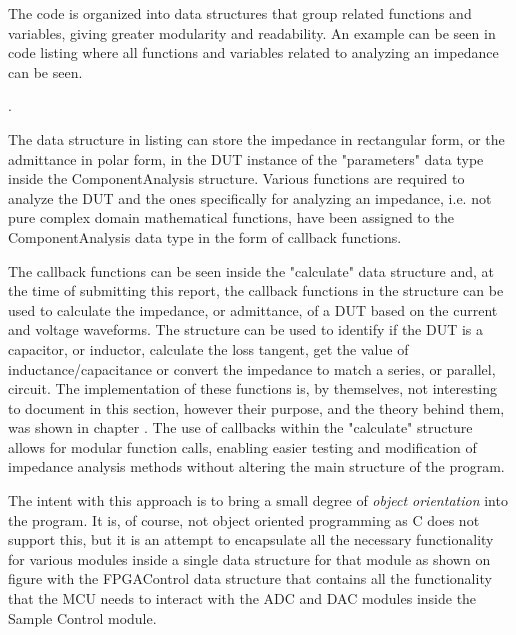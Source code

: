 The code is organized into data structures that group related functions and variables, giving greater modularity and readability. An example can be seen in code listing  where all functions and variables related to analyzing an impedance can be seen.

. 

The data structure in listing  can store the impedance in rectangular form, or the admittance in polar form, in the DUT instance of the "parameters" data type inside the ComponentAnalysis structure. Various functions are required to analyze the DUT and the ones specifically for analyzing an impedance, i.e. not pure complex domain mathematical functions, have been assigned to the ComponentAnalysis data type in the form of callback functions.

The callback functions can be seen inside the "calculate" data structure and, at the time of submitting this report, the callback functions in the structure can be used to calculate the impedance, or admittance, of a DUT based on the current and voltage waveforms. The structure can be used to identify if the DUT is a capacitor, or inductor, calculate the loss tangent, get the value of inductance/capacitance or convert the impedance to match a series, or parallel, circuit. The implementation of these functions is, by themselves, not interesting to document in this section, however their purpose, and the theory behind them, was shown in chapter . The use of callbacks within the "calculate" structure allows for modular function calls, enabling easier testing and modification of impedance analysis methods without altering the main structure of the program.

The intent with this approach is to bring a small degree of \textit{object orientation} into the program. It is, of course, not object oriented programming as C does not support this, but it is an attempt to encapsulate all the necessary functionality for various modules inside a single data structure for that module as shown on figure  with the FPGAControl data structure that contains all the functionality that the MCU needs to interact with the ADC and DAC modules inside the Sample Control module.

